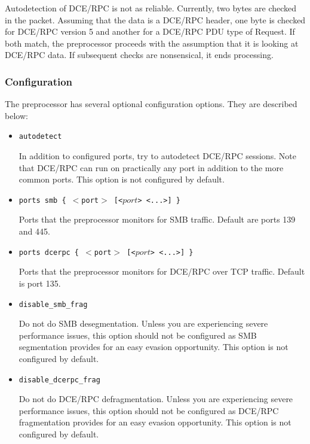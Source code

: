 \documentclass[english]{report}
\begin{document}
Autodetection of DCE/RPC is not as reliable.  Currently, two bytes are checked
in the packet.  Assuming that the data is a DCE/RPC header, one byte is checked
for DCE/RPC version 5 and another for a DCE/RPC PDU type of Request.  If both
match, the preprocessor proceeds with the assumption that it is looking at
DCE/RPC data.  If subsequent checks are nonsensical, it ends processing.

\subsubsection{Configuration}

The preprocessor has several optional configuration options.  They are
described below:

\begin{itemize}

\item \texttt{autodetect}
\newline

In addition to configured ports, try to autodetect DCE/RPC sessions.  Note that
DCE/RPC can run on practically any port in addition to the more common ports.
This option is not configured by default.

\item \texttt{ports smb \{ $<$port$>$ [<$port$> <...>] \}}
\newline

Ports that the preprocessor monitors for SMB traffic.  Default are ports 139
and 445.

\item \texttt{ports dcerpc \{ $<$port$>$ [<$port$> <...>] \}}
\newline

Ports that the preprocessor monitors for DCE/RPC over TCP traffic.  Default is
port 135.

\item \texttt{disable\_smb\_frag}
\newline

Do not do SMB desegmentation.  Unless you are experiencing severe performance
issues, this option should not be configured as SMB segmentation provides for
an easy evasion opportunity.  This option is not configured by default.

\item \texttt{disable\_dcerpc\_frag}
\newline

Do not do DCE/RPC defragmentation.  Unless you are experiencing severe
performance issues, this option should not be configured as DCE/RPC
fragmentation provides for an easy evasion opportunity.  This option is not
configured by default.


\end{itemize}
\end{document}
